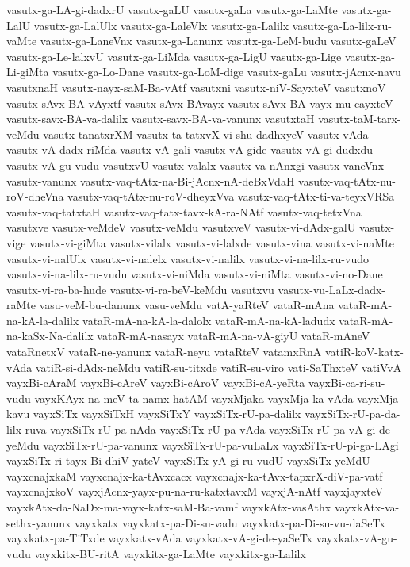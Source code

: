 {vasutx-ga-LA-gi-dadxrU
vasutx-gaLU
vasutx-gaLa
vasutx-ga-LaMte
vasutx-ga-LalU
vasutx-ga-LalUlx
vasutx-ga-LaleVlx
vasutx-ga-Lalilx
vasutx-ga-La-lilx-ru-vaMte
vasutx-ga-LaneVnx
vasutx-ga-Lanunx
vasutx-ga-LeM-budu
vasutx-gaLeV
vasutx-ga-Le-lalxvU
vasutx-ga-LiMda
vasutx-ga-LigU
vasutx-ga-Lige
vasutx-ga-Li-giMta
vasutx-ga-Lo-Dane
vasutx-ga-LoM-dige
vasutx-gaLu
vasutx-jAcnx-navu
vasutxnaH
vasutx-nayx-saM-Ba-vAtf
vasutxni
vasutx-niV-SayxteV
vasutxnoV
vasutx-sAvx-BA-vAyxtf
vasutx-sAvx-BAvayx
vasutx-sAvx-BA-vayx-mu-cayxteV
vasutx-savx-BA-va-dalilx
vasutx-savx-BA-va-vanunx
vasutxtaH
vasutx-taM-tarx-veMdu
vasutx-tanatxrXM
vasutx-ta-tatxvX-vi-shu-dadhxyeV
vasutx-vAda
vasutx-vA-dadx-riMda
vasutx-vA-gali
vasutx-vA-gide
vasutx-vA-gi-dudxdu
vasutx-vA-gu-vudu
vasutxvU
vasutx-valalx
vasutx-va-nAnxgi
vasutx-vaneVnx
vasutx-vanunx
vasutx-vaq-tAtx-na-Bi-jAcnx-nA-deBxVdaH
vasutx-vaq-tAtx-nu-roV-dheVna
vasutx-vaq-tAtx-nu-roV-dheyxVva
vasutx-vaq-tAtx-ti-va-teyxVRSa
vasutx-vaq-tatxtaH
vasutx-vaq-tatx-tavx-kA-ra-NAtf
vasutx-vaq-tetxVna
vasutxve
vasutx-veMdeV
vasutx-veMdu
vasutxveV
vasutx-vi-dAdx-galU
vasutx-vige
vasutx-vi-giMta
vasutx-vilalx
vasutx-vi-lalxde
vasutx-vina
vasutx-vi-naMte
vasutx-vi-nalUlx
vasutx-vi-nalelx
vasutx-vi-nalilx
vasutx-vi-na-lilx-ru-vudo
vasutx-vi-na-lilx-ru-vudu
vasutx-vi-niMda
vasutx-vi-niMta
vasutx-vi-no-Dane
vasutx-vi-ra-ba-hude
vasutx-vi-ra-beV-keMdu
vasutxvu
vasutx-vu-LaLx-dadx-raMte
vasu-veM-bu-danunx
vasu-veMdu
vatA-yaRteV
vataR-mAna
vataR-mA-na-kA-la-dalilx
vataR-mA-na-kA-la-dalolx
vataR-mA-na-kA-ladudx
vataR-mA-na-kaSx-Na-dalilx
vataR-mA-nasayx
vataR-mA-na-vA-giyU
vataR-mAneV
vataRnetxV
vataR-ne-yanunx
vataR-neyu
vataRteV
vatamxRnA
vatiR-koV-katx-vAda
vatiR-si-dAdx-neMdu
vatiR-su-titxde
vatiR-su-viro
vati-SaThxteV
vatiVvA
vayxBi-cAraM
vayxBi-cAreV
vayxBi-cAroV
vayxBi-cA-yeRta
vayxBi-ca-ri-su-vudu
vayxKAyx-na-meV-ta-namx-hatAM
vayxMjaka
vayxMja-ka-vAda
vayxMja-kavu
vayxSiTx
vayxSiTxH
vayxSiTxY
vayxSiTx-rU-pa-dalilx
vayxSiTx-rU-pa-da-lilx-ruva
vayxSiTx-rU-pa-nAda
vayxSiTx-rU-pa-vAda
vayxSiTx-rU-pa-vA-gi-de-yeMdu
vayxSiTx-rU-pa-vanunx
vayxSiTx-rU-pa-vuLaLx
vayxSiTx-rU-pi-ga-LAgi
vayxSiTx-ri-tayx-Bi-dhiV-yateV
vayxSiTx-yA-gi-ru-vudU
vayxSiTx-yeMdU
vayxcnajxkaM
vayxcnajx-ka-tAvxcacx
vayxcnajx-ka-tAvx-tapxrX-diV-pa-vatf
vayxcnajxkoV
vayxjAcnx-yayx-pu-na-ru-katxtavxM
vayxjA-nAtf
vayxjayxteV
vayxkAtx-da-NaDx-ma-vayx-katx-saM-Ba-vamf
vayxkAtx-vasAthx
vayxkAtx-va-sethx-yanunx
vayxkatx
vayxkatx-pa-Di-su-vadu
vayxkatx-pa-Di-su-vu-daSeTx
vayxkatx-pa-TiTxde
vayxkatx-vAda
vayxkatx-vA-gi-de-yaSeTx
vayxkatx-vA-gu-vudu
vayxkitx-BU-ritA
vayxkitx-ga-LaMte
vayxkitx-ga-Lalilx
}
